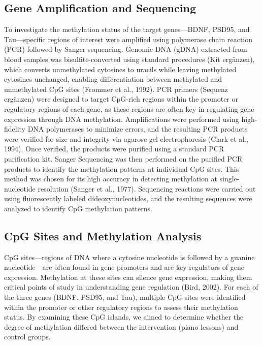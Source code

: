 \documentclass[
]{agujournal2019}
\begin{document}
\subsection{Gene Amplification and
Sequencing}\label{gene-amplification-and-sequencing}

To investigate the methylation status of the target genes---BDNF, PSD95,
and Tau---specific regions of interest were amplified using polymerase
chain reaction (PCR) followed by Sanger sequencing. Genomic DNA (gDNA)
extracted from blood samples was bisulfite-converted using standard
procedures (Kit ergänzen), which converts unmethylated cytosines to
uracils while leaving methylated cytosines unchanged, enabling
differentiation between methylated and unmethylated CpG sites (Frommer
et al., 1992). PCR primers (Sequenz ergänzen) were designed to target
CpG-rich regions within the promoter or regulatory regions of each gene,
as these regions are often key in regulating gene expression through DNA
methylation. Amplifications were performed using high-fidelity DNA
polymerases to minimize errors, and the resulting PCR products were
verified for size and integrity via agarose gel electrophoresis (Clark
et al., 1994). Once verified, the products were purified using a
standard PCR purification kit. Sanger Sequencing was then performed on
the purified PCR products to identify the methylation patterns at
individual CpG sites. This method was chosen for its high accuracy in
detecting methylation at single-nucleotide resolution (Sanger et al.,
1977). Sequencing reactions were carried out using fluorescently labeled
dideoxynucleotides, and the resulting sequences were analyzed to
identify CpG methylation patterns.

\subsection{CpG Sites and Methylation
Analysis}\label{cpg-sites-and-methylation-analysis}

CpG sites---regions of DNA where a cytosine nucleotide is followed by a
guanine nucleotide---are often found in gene promoters and are key
regulators of gene expression. Methylation at these sites can silence
gene expression, making them critical points of study in understanding
gene regulation (Bird, 2002). For each of the three genes (BDNF, PSD95,
and Tau), multiple CpG sites were identified within the promoter or
other regulatory regions to assess their methylation status. By
examining these CpG islands, we aimed to determine whether the degree of
methylation differed between the intervention (piano lessons) and
control groups.
\end{document}
